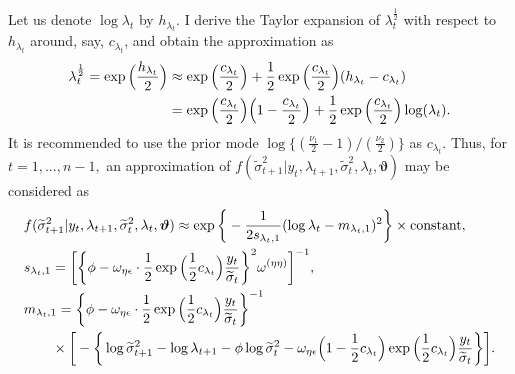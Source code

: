 \documentclass[11pt]{article}
\begin{document}
Let us denote $\log\lambda_t$ by $h_{\lambda_t}$. 
I derive the Taylor expansion of $\lambda_t^{\frac{1}{2}}$ with respect to $h_{\lambda_t}$ around, say, $c_{\lambda_t}$, and obtain the approximation as  
\begin{align}
\lambda_t^{\frac{1}{2}} =\exp\Big(\frac{h_{\lambda_t}}{2}\Big) &\approx \exp\Big(\frac{c_{\lambda_t}}{2}\Big) +\frac{1}{2}\exp\Big(\frac{c_{\lambda_t}}{2}\Big)(h_{\lambda_t}-c_{\lambda_t}) \notag \\
&=\exp\Big(\frac{c_{\lambda_t}}{2}\Big)\Big(1-\frac{c_{\lambda_t}}{2}\Big) +\frac{1}{2}\exp\Big(\frac{c_{\lambda_t}}{2}\Big)\log(\lambda_t).
\end{align}
It is recommended to use the prior mode $\log\{ (\frac{\nu_1}{2}-1)/(\frac{\nu_2}{2}) \}$ as $c_{\lambda_t}$. 
Thus, for $t=1, \ldots, n-1,$ an approximation of $f(\widetilde{\sigma}^2_{t+1} |y_t, \lambda_{t+1}, \widetilde{\sigma}^2_{t}, \lambda_t, \bm{\vartheta})$ may be considered as 
\begin{align}
&f(\widetilde{\sigma}^2_{t+1} |y_t, \lambda_{t+1}, \widetilde{\sigma}^2_{t}, \lambda_t, \bm{\vartheta}) 
\approx \exp \bigg\{ -\frac{1}{2s_{\lambda_t, 1}}(\log\lambda_t -m_{\lambda_t, 1})^2 \bigg\} \times\text{constant}, \\
&s_{\lambda_t, 1} =\bigg[ \bigg\{ \phi-\omega_{\eta\epsilon}\cdot\frac{1}{2}\exp\Big(\frac{1}{2}c_{\lambda_t}\Big) \frac{y_t}{\widetilde{\sigma}_{t}} \bigg\}^2 \omega^{(\eta\eta)} \bigg]^{-1}, \\
&m_{\lambda_t, 1} 
= 
\bigg\{ \phi-\omega_{\eta\epsilon}\cdot\frac{1}{2}\exp\Big(\frac{1}{2}c_{\lambda_t}\Big) \frac{y_t}{\widetilde{\sigma}_{t}} \bigg\}^{-1} \notag \\
&\hspace{20pt} \times\bigg[ -\bigg\{\log\widetilde{\sigma}^2_{t+1} -\log\lambda_{t+1} -\phi\log\widetilde{\sigma}^2_{t}  -\omega_{\eta\epsilon} \Big(1-\frac{1}{2}c_{\lambda_t}\Big) \exp\Big(\frac{1}{2}c_{\lambda_t}\Big) \frac{y_t}{\widetilde{\sigma}_{t}} \bigg\}\bigg]. 
\end{align}
\end{document}
